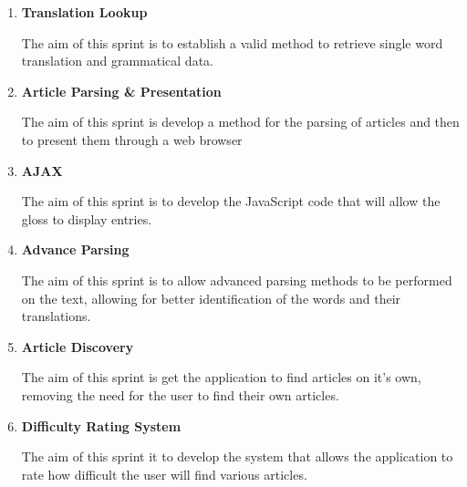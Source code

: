 \begin{enumerate}
	\item \textbf{Translation Lookup}
	
	The aim of this sprint is to establish a valid method to retrieve single word translation and grammatical data.
	
	\item \textbf{Article Parsing \& Presentation}
	
	The aim of this sprint is develop a method for the parsing of articles and then to present them through a web browser
	
	\item \textbf{AJAX}
	
	The aim of this sprint is to develop the JavaScript code that will allow the gloss to display entries.
	
	\item \textbf{Advance Parsing}
	
	The aim of this sprint is to allow advanced parsing methods to be performed on the text, allowing for better identification of the words and their translations. 
	
	\item \textbf{Article Discovery}
	
	The aim of this sprint is get the application to find articles on it's own, removing the need for the user to find their own articles.
	
	\item \textbf{Difficulty Rating System}
	
	The aim of this sprint it to develop the system that allows the application to rate how difficult the user will find various articles. 
	
\end{enumerate}
